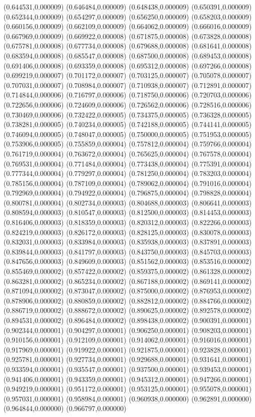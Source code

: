 {(0.644531,0.000009) (0.646484,0.000009) (0.648438,0.000009) (0.650391,0.000009) (0.652344,0.000009) (0.654297,0.000009) (0.656250,0.000009) (0.658203,0.000009) (0.660156,0.000009) (0.662109,0.000009) (0.664062,0.000009) (0.666016,0.000009) (0.667969,0.000009) (0.669922,0.000008) (0.671875,0.000008) (0.673828,0.000008) (0.675781,0.000008) (0.677734,0.000008) (0.679688,0.000008) (0.681641,0.000008) (0.683594,0.000008) (0.685547,0.000008) (0.687500,0.000008) (0.689453,0.000008) (0.691406,0.000008) (0.693359,0.000008) (0.695312,0.000008) (0.697266,0.000008) (0.699219,0.000007) (0.701172,0.000007) (0.703125,0.000007) (0.705078,0.000007) (0.707031,0.000007) (0.708984,0.000007) (0.710938,0.000007) (0.712891,0.000007) (0.714844,0.000006) (0.716797,0.000006) (0.718750,0.000006) (0.720703,0.000006) (0.722656,0.000006) (0.724609,0.000006) (0.726562,0.000006) (0.728516,0.000006) (0.730469,0.000006) (0.732422,0.000005) (0.734375,0.000005) (0.736328,0.000005) (0.738281,0.000005) (0.740234,0.000005) (0.742188,0.000005) (0.744141,0.000005) (0.746094,0.000005) (0.748047,0.000005) (0.750000,0.000005) (0.751953,0.000005) (0.753906,0.000005) (0.755859,0.000004) (0.757812,0.000004) (0.759766,0.000004) (0.761719,0.000004) (0.763672,0.000004) (0.765625,0.000004) (0.767578,0.000004) (0.769531,0.000004) (0.771484,0.000004) (0.773438,0.000004) (0.775391,0.000004) (0.777344,0.000004) (0.779297,0.000004) (0.781250,0.000004) (0.783203,0.000004) (0.785156,0.000004) (0.787109,0.000004) (0.789062,0.000004) (0.791016,0.000004) (0.792969,0.000004) (0.794922,0.000004) (0.796875,0.000004) (0.798828,0.000004) (0.800781,0.000004) (0.802734,0.000003) (0.804688,0.000003) (0.806641,0.000003) (0.808594,0.000003) (0.810547,0.000003) (0.812500,0.000003) (0.814453,0.000003) (0.816406,0.000003) (0.818359,0.000003) (0.820312,0.000003) (0.822266,0.000003) (0.824219,0.000003) (0.826172,0.000003) (0.828125,0.000003) (0.830078,0.000003) (0.832031,0.000003) (0.833984,0.000003) (0.835938,0.000003) (0.837891,0.000003) (0.839844,0.000003) (0.841797,0.000003) (0.843750,0.000003) (0.845703,0.000003) (0.847656,0.000003) (0.849609,0.000003) (0.851562,0.000003) (0.853516,0.000002) (0.855469,0.000002) (0.857422,0.000002) (0.859375,0.000002) (0.861328,0.000002) (0.863281,0.000002) (0.865234,0.000002) (0.867188,0.000002) (0.869141,0.000002) (0.871094,0.000002) (0.873047,0.000002) (0.875000,0.000002) (0.876953,0.000002) (0.878906,0.000002) (0.880859,0.000002) (0.882812,0.000002) (0.884766,0.000002) (0.886719,0.000002) (0.888672,0.000002) (0.890625,0.000002) (0.892578,0.000002) (0.894531,0.000002) (0.896484,0.000002) (0.898438,0.000002) (0.900391,0.000001) (0.902344,0.000001) (0.904297,0.000001) (0.906250,0.000001) (0.908203,0.000001) (0.910156,0.000001) (0.912109,0.000001) (0.914062,0.000001) (0.916016,0.000001) (0.917969,0.000001) (0.919922,0.000001) (0.921875,0.000001) (0.923828,0.000001) (0.925781,0.000001) (0.927734,0.000001) (0.929688,0.000001) (0.931641,0.000001) (0.933594,0.000001) (0.935547,0.000001) (0.937500,0.000001) (0.939453,0.000001) (0.941406,0.000001) (0.943359,0.000001) (0.945312,0.000001) (0.947266,0.000001) (0.949219,0.000001) (0.951172,0.000001) (0.953125,0.000001) (0.955078,0.000001) (0.957031,0.000001) (0.958984,0.000001) (0.960938,0.000000) (0.962891,0.000000) (0.964844,0.000000) (0.966797,0.000000) }

